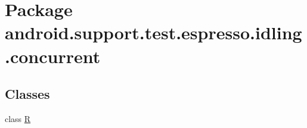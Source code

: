 \hypertarget{namespaceandroid_1_1support_1_1test_1_1espresso_1_1idling_1_1concurrent}{}\section{Package android.\+support.\+test.\+espresso.\+idling.\+concurrent}
\label{namespaceandroid_1_1support_1_1test_1_1espresso_1_1idling_1_1concurrent}
\subsection*{Classes}
\begin{DoxyCompactItemize}
\item 
class \mbox{\hyperlink{classandroid_1_1support_1_1test_1_1espresso_1_1idling_1_1concurrent_1_1R}{R}}
\end{DoxyCompactItemize}
